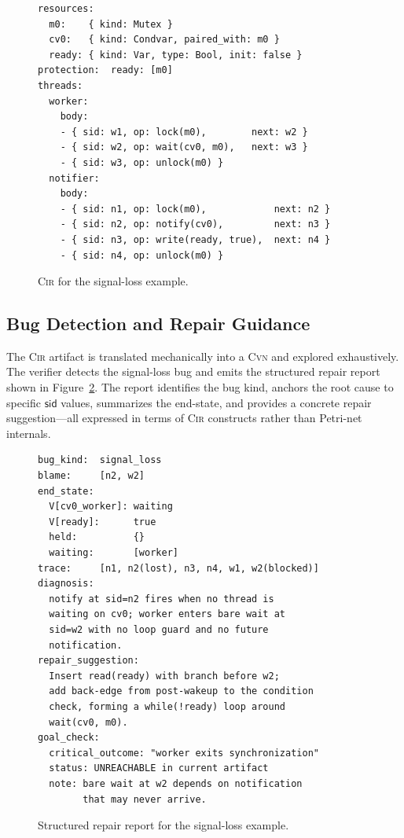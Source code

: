 \begin{figure}[t]
\begin{lstlisting}[basicstyle=\small\ttfamily, frame=single]
resources:
  m0:    { kind: Mutex }
  cv0:   { kind: Condvar, paired_with: m0 }
  ready: { kind: Var, type: Bool, init: false }
protection:  ready: [m0]
threads:
  worker:
    body:
    - { sid: w1, op: lock(m0),        next: w2 }
    - { sid: w2, op: wait(cv0, m0),   next: w3 }
    - { sid: w3, op: unlock(m0) }
  notifier:
    body:
    - { sid: n1, op: lock(m0),            next: n2 }
    - { sid: n2, op: notify(cv0),         next: n3 }
    - { sid: n3, op: write(ready, true),  next: n4 }
    - { sid: n4, op: unlock(m0) }
\end{lstlisting}
\caption{\textsc{Cir} for the signal-loss example.}
\label{fig:cir-a}
\end{figure}

\subsection{Bug Detection and Repair Guidance}
\label{subsec:repair-demo}

The \textsc{Cir} artifact is translated mechanically into a \textsc{Cvn} and explored exhaustively. The verifier detects the signal-loss bug and emits the structured repair report shown in Figure~\ref{fig:repair-report}. The report identifies the bug kind, anchors the root cause to specific $\mathsf{sid}$ values, summarizes the end-state, and provides a concrete repair suggestion---all expressed in terms of \textsc{Cir} constructs rather than Petri-net internals.

\begin{figure}[t]
\begin{lstlisting}[basicstyle=\small\ttfamily, frame=single]
bug_kind:  signal_loss
blame:     [n2, w2]
end_state:
  V[cv0_worker]: waiting
  V[ready]:      true
  held:          {}
  waiting:       [worker]
trace:     [n1, n2(lost), n3, n4, w1, w2(blocked)]
diagnosis:
  notify at sid=n2 fires when no thread is
  waiting on cv0; worker enters bare wait at
  sid=w2 with no loop guard and no future
  notification.
repair_suggestion:
  Insert read(ready) with branch before w2;
  add back-edge from post-wakeup to the condition
  check, forming a while(!ready) loop around
  wait(cv0, m0).
goal_check:
  critical_outcome: "worker exits synchronization"
  status: UNREACHABLE in current artifact
  note: bare wait at w2 depends on notification
        that may never arrive.
\end{lstlisting}
\caption{Structured repair report for the signal-loss example.}
\label{fig:repair-report}
\end{figure}


